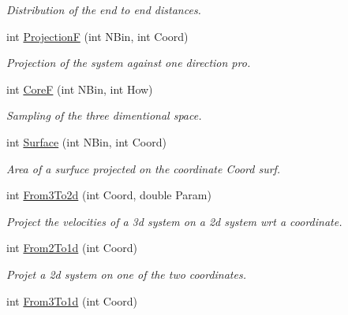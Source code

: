 \begin{DoxyCompactItemize}
\begin{DoxyCompactList}\small\item\em \-Distribution of the end to end distances. \end{DoxyCompactList}\item 
\hypertarget{classElPoly_aa2dbcd635807df0929968ec8932631ab}{int \hyperlink{classElPoly_aa2dbcd635807df0929968ec8932631ab}{\-Projection\-F} (int \-N\-Bin, int \-Coord)}\label{classElPoly_aa2dbcd635807df0929968ec8932631ab}

\begin{DoxyCompactList}\small\item\em \-Projection of the system against one direction  pro. \end{DoxyCompactList}\item 
int \hyperlink{classElPoly_a04dd79cb2f5e46ae301b6dc1d57db28a}{\-Core\-F} (int \-N\-Bin, int \-How)
\begin{DoxyCompactList}\small\item\em \-Sampling of the three dimentional space. \end{DoxyCompactList}\item 
\hypertarget{classElPoly_a52844d3cee2d60eb47889fb021e10fc8}{int \hyperlink{classElPoly_a52844d3cee2d60eb47889fb021e10fc8}{\-Surface} (int \-N\-Bin, int \-Coord)}\label{classElPoly_a52844d3cee2d60eb47889fb021e10fc8}

\begin{DoxyCompactList}\small\item\em \-Area of a surfuce projected on the coordinate \-Coord  surf. \end{DoxyCompactList}\item 
\hypertarget{classElPoly_a4e71c4abd7c3ed37f29a8fcae064fd32}{int \hyperlink{classElPoly_a4e71c4abd7c3ed37f29a8fcae064fd32}{\-From3\-To2d} (int \-Coord, double \-Param)}\label{classElPoly_a4e71c4abd7c3ed37f29a8fcae064fd32}

\begin{DoxyCompactList}\small\item\em \-Project the velocities of a 3d system on a 2d system wrt a coordinate. \end{DoxyCompactList}\item 
\hypertarget{classElPoly_a30e6658740047a2fdd996e2b843e91b9}{int \hyperlink{classElPoly_a30e6658740047a2fdd996e2b843e91b9}{\-From2\-To1d} (int \-Coord)}\label{classElPoly_a30e6658740047a2fdd996e2b843e91b9}

\begin{DoxyCompactList}\small\item\em \-Projet a 2d system on one of the two coordinates. \end{DoxyCompactList}\item 
\hypertarget{classElPoly_a0b9109dcecbeec17c94472b5e638580a}{int \hyperlink{classElPoly_a0b9109dcecbeec17c94472b5e638580a}{\-From3\-To1d} (int \-Coord)}\label{classElPoly_a0b9109dcecbeec17c94472b5e638580a}


\end{DoxyCompactItemize}
